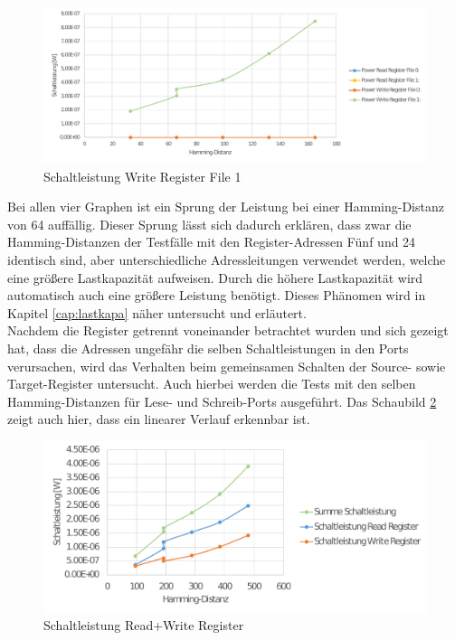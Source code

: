 \begin{figure}[H]
	\centering
	\includegraphics[width=\textwidth]{fig/register_eval_target_port1.pdf}
	\caption{Schaltleistung Write Register File 1}
	\label{fig:target1_power}
\end{figure}

Bei allen vier Graphen ist ein Sprung der Leistung bei einer Hamming-Distanz von 64 auffällig. Dieser Sprung lässt sich dadurch erklären, dass zwar die Hamming-Distanzen der Testfälle mit den Register-Adressen Fünf und 24 identisch sind, aber unterschiedliche Adressleitungen verwendet werden, welche eine größere Lastkapazität aufweisen. Durch die höhere Lastkapazität wird automatisch auch eine größere Leistung benötigt. Dieses Phänomen wird in Kapitel \ref{cap:lastkapa} näher untersucht und erläutert.\\
Nachdem die Register getrennt voneinander betrachtet wurden und sich gezeigt hat, dass die Adressen ungefähr die selben Schaltleistungen in den Ports verursachen, wird das Verhalten beim gemeinsamen Schalten der Source- sowie Target-Register untersucht. Auch hierbei werden die Tests mit den selben Hamming-Distanzen für Lese- und Schreib-Ports ausgeführt. Das Schaubild \ref{fig:source_target_power} zeigt auch hier, dass ein linearer Verlauf erkennbar ist.

\begin{figure}[H]
	\centering
	\includegraphics[width=\textwidth]{fig/source_target_power.pdf}
	\caption{Schaltleistung Read+Write Register}
	\label{fig:source_target_power}
\end{figure}

